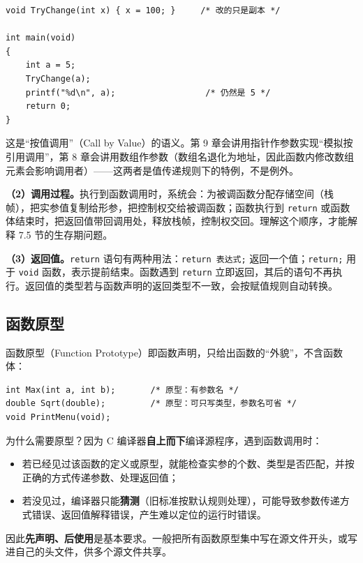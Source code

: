 \begin{lstlisting}
void TryChange(int x) { x = 100; }     /* 改的只是副本 */

int main(void)
{
    int a = 5;
    TryChange(a);
    printf("%d\n", a);                  /* 仍然是 5 */
    return 0;
}
\end{lstlisting}

这是“按值调用”（Call by Value）的语义。第 9 章会讲用指针作参数实现“模拟按引用调用”，第 8 章会讲用数组作参数（数组名退化为地址，因此函数内修改数组元素会影响调用者）——这两者是值传递规则下的特例，不是例外。

\textbf{（2）调用过程。}执行到函数调用时，系统会：为被调函数分配存储空间（栈帧），把实参值复制给形参，把控制权交给被调函数；函数执行到 \texttt{return} 或函数体结束时，把返回值带回调用处，释放栈帧，控制权交回。理解这个顺序，才能解释 7.5 节的生存期问题。

\textbf{（3）返回值。}\texttt{return} 语句有两种用法：\texttt{return 表达式;} 返回一个值；\texttt{return;} 用于 \texttt{void} 函数，表示提前结束。函数遇到 \texttt{return} 立即返回，其后的语句不再执行。返回值的类型若与函数声明的返回类型不一致，会按赋值规则自动转换。

\subsection{函数原型}

函数原型（Function Prototype）即函数声明，只给出函数的“外貌”，不含函数体：

\begin{lstlisting}
int Max(int a, int b);       /* 原型：有参数名 */
double Sqrt(double);         /* 原型：可只写类型，参数名可省 */
void PrintMenu(void);
\end{lstlisting}

为什么需要原型？因为 C 编译器\textbf{自上而下}编译源程序，遇到函数调用时：

\begin{itemize}
  \item 若已经见过该函数的定义或原型，就能检查实参的个数、类型是否匹配，并按正确的方式传递参数、处理返回值；
  \item 若没见过，编译器只能\textbf{猜测}（旧标准按默认规则处理），可能导致参数传递方式错误、返回值解释错误，产生难以定位的运行时错误。
\end{itemize}

因此\textbf{先声明、后使用}是基本要求。一般把所有函数原型集中写在源文件开头，或写进自己的头文件，供多个源文件共享。

